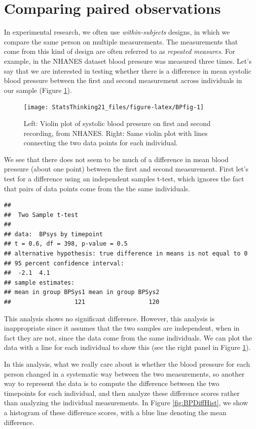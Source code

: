 \documentclass[12pt,]{book}
\theoremstyle{definition}
\theoremstyle{definition}
\theoremstyle{definition}
\theoremstyle{remark}
\begin{document}
\hypertarget{paired-ttests}{%
\section{Comparing paired observations}\label{paired-ttests}}

In experimental research, we often use \emph{within-subjects} designs, in which we compare the same person on multiple measurements. The measurements that come from this kind of design are often referred to as \emph{repeated measures}. For example, in the NHANES dataset blood pressure was measured three times. Let's say that we are interested in testing whether there is a difference in mean systolic blood pressure between the first and second measurement across individuals in our sample (Figure \ref{fig:BPfig}).

\begin{figure}
\texttt{[image: StatsThinking21\_files/figure-latex/BPfig-1]} \caption{Left: Violin plot of systolic blood pressure on first and second recording, from NHANES. Right: Same violin plot with lines connecting the two data points for each individual.}\label{fig:BPfig}
\end{figure}

We see that there does not seem to be much of a difference in mean blood pressure (about one point) between the first and second measurement. First let's test for a difference using an independent samples t-test, which ignores the fact that pairs of data points come from the the same individuals.

\begin{verbatim}
## 
##  Two Sample t-test
## 
## data:  BPsys by timepoint
## t = 0.6, df = 398, p-value = 0.5
## alternative hypothesis: true difference in means is not equal to 0
## 95 percent confidence interval:
##  -2.1  4.1
## sample estimates:
## mean in group BPSys1 mean in group BPSys2 
##                  121                  120
\end{verbatim}

This analysis shows no significant difference. However, this analysis is inappropriate since it assumes that the two samples are independent, when in fact they are not, since the data come from the same individuals. We can plot the data with a line for each individual to show this (see the right panel in Figure \ref{fig:BPfig}).

In this analysis, what we really care about is whether the blood pressure for each person changed in a systematic way between the two measurements, so another way to represent the data is to compute the difference between the two timepoints for each individual, and then analyze these difference scores rather than analyzing the individual measurements. In Figure \ref{fig:BPDiffHist}, we show a histogram of these difference scores, with a blue line denoting the mean difference.
\end{document}
